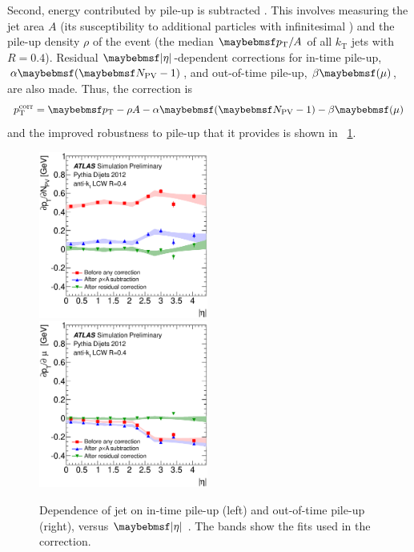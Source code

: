 \begin{description}
	Second, energy contributed by pile-up is subtracted \cite{Jets:PileupCorrection:2012}.
	This involves measuring the jet area $A$ (its susceptibility to additional particles 
	with infinitesimal \pt) and the pile-up density $\rho$ of the event (the median $\pt/A$ 
	of all $k_{\text{T}}$ jets with $R=0.4$). Residual $\mods{\eta}$-dependent corrections 
	for in-time pile-up, $\alpha \parenths{\npv - 1}$, and out-of-time pile-up, 
	$\beta \parenths{\mu}$, are also made. Thus, the correction is
	\begin{equation}
		p_{\text{T}}^{\text{corr}} = \pt - \rho A - \alpha \parenths{\npv - 1} 
		- \beta \parenths{\mu}
	\end{equation}
	and the improved robustness to pile-up that it provides is shown in 
	\Figure~\ref{fig:objects:jet_pu_corr}.

	\begin{figure}
		\includegraphics[width=0.495\textwidth]{tex/selection/jet_pu_npv}
		\hfill
		\includegraphics[width=0.495\textwidth]{tex/selection/jet_pu_mu}
		\caption{Dependence of jet \pt on in-time pile-up (left) and out-of-time pile-up 
		(right), versus $\mods{\eta}$ \cite{Jets:PileupCorrection:2012}. The bands show 
		the fits used in the correction.}
		\label{fig:objects:jet_pu_corr}
	\end{figure}


\end{description}
